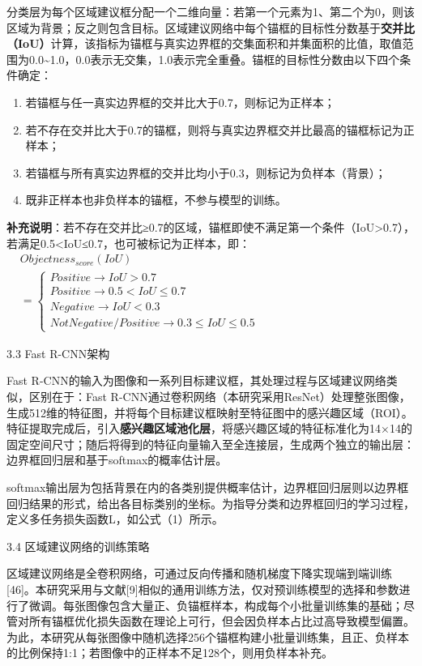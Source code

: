分类层为每个区域建议框分配一个二维向量：若第一个元素为1、第二个为0，则该区域为背景；反之则包含目标。区域建议网络中每个锚框的目标性分数基于\textbf{交并比（IoU）}计算，该指标为锚框与真实边界框的交集面积和并集面积的比值，取值范围为0.0\textasciitilde1.0，0.0表示无交集，1.0表示完全重叠。锚框的目标性分数由以下四个条件确定：

\begin{enumerate}
	\def\labelenumi{\arabic{enumi}.}
	\item
	若锚框与任一真实边界框的交并比大于0.7，则标记为正样本；
	\item
	若不存在交并比大于0.7的锚框，则将与真实边界框交并比最高的锚框标记为正样本；
	\item
	若锚框与所有真实边界框的交并比均小于0.3，则标记为负样本（背景）；
	\item
	既非正样本也非负样本的锚框，不参与模型的训练。
\end{enumerate}

\textbf{补充说明}：若不存在交并比≥0.7的区域，锚框即使不满足第一个条件（IoU\textgreater0.7），若满足0.5\textless IoU≤0.7，也可被标记为正样本，即：\\
\(\begin{aligned} & Objectness _{score }(I o U) \\ & =\begin{cases} Positive \to I o U>0.7 \\ Positive \to 0.5<I o U \leq 0.7 \\ Negative \to I o U<0.3 \\ Not Negative/Positive \to 0.3 \leq I o U \leq 0.5 \end{cases} \end{aligned}\)

3.3 Fast R-CNN架构

Fast
R-CNN的输入为图像和一系列目标建议框，其处理过程与区域建议网络类似，区别在于：Fast
R-CNN通过卷积网络（本研究采用ResNet）处理整张图像，生成512维的特征图，并将每个目标建议框映射至特征图中的感兴趣区域（ROI）。特征提取完成后，引入\textbf{感兴趣区域池化层}，将感兴趣区域的特征标准化为14×14的固定空间尺寸；随后将得到的特征向量输入至全连接层，生成两个独立的输出层：边界框回归层和基于softmax的概率估计层。

softmax输出层为包括背景在内的各类别提供概率估计，边界框回归层则以边界框回归结果的形式，给出各目标类别的坐标。为指导分类和边界框回归的学习过程，定义多任务损失函数L，如公式（1）所示。

3.4 区域建议网络的训练策略

区域建议网络是全卷积网络，可通过反向传播和随机梯度下降实现端到端训练{[}46{]}。本研究采用与文献{[}9{]}相似的通用训练方法，仅对预训练模型的选择和参数进行了微调。每张图像包含大量正、负锚框样本，构成每个小批量训练集的基础；尽管对所有锚框优化损失函数在理论上可行，但会因负样本占比过高导致模型偏置。为此，本研究从每张图像中随机选择256个锚框构建小批量训练集，且正、负样本的比例保持1:1；若图像中的正样本不足128个，则用负样本补充。

